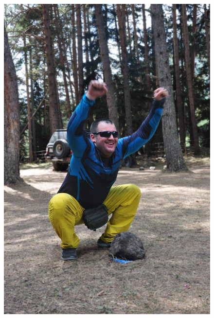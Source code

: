 \begin{figure}[h!]
	\centering
	\begin{minipage}[h]{0.35\linewidth}
		\includegraphics[width=\linewidth]{../pics/DSC_1150.jpg}
	\end{minipage}
	\quad
	\begin{minipage}[h]{0.35\linewidth}

\end{minipage}
\end{figure}
